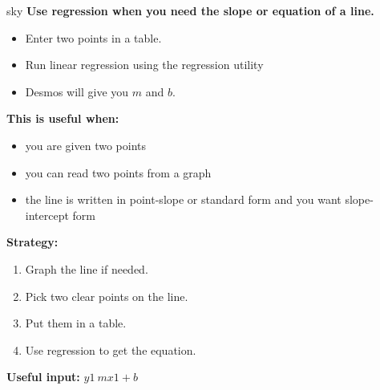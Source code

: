 \documentclass[14pt]{article}
\begin{document}
    \begin{skillbox}{sky}
        \textbf{Use regression when you need the slope or equation of a line.}
        \begin{itemize}
            \item Enter two points in a table.
            \item Run linear regression using the regression utility
            \item Desmos will give you \textbf{$m$} and \textbf{$b$}.
        \end{itemize}

        \textbf{This is useful when:}
        \begin{itemize}
            \item you are given two points
            \item you can read two points from a graph
            \item the line is written in point-slope or standard form and you want slope-intercept form
        \end{itemize}

        \textbf{Strategy:}
        \begin{enumerate}
            \item Graph the line if needed.
            \item Pick two clear points on the line.
            \item Put them in a table.
            \item Use regression to get the equation.
        \end{enumerate}

        \textbf{Useful input:} $ y1~mx1+b $
    \end{skillbox}
\end{document}
